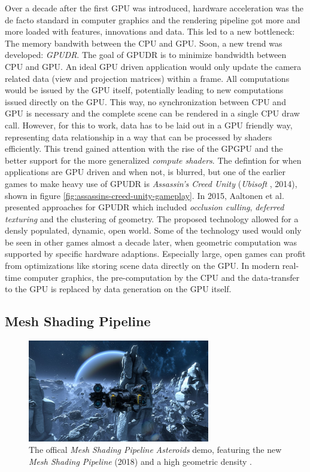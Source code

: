 Over a decade after the first \ac{GPU} was introduced, hardware acceleration was the de facto standard in 
computer graphics and the rendering pipeline got more and more loaded with features, innovations and data. 
This led to a new bottleneck: The memory bandwith between the \ac{CPU} and \ac{GPU}. Soon, a new trend was 
developed: \emph{\ac{GPUDR}}. The goal of \ac{GPUDR} is to minimize bandwidth between \ac{CPU} and \ac{GPU}. 
An ideal \ac{GPU} driven application would only update the camera related data (view and projection matrices) 
within a frame. All computations would be issued by the \ac{GPU} itself, potentially leading to new computations 
issued directly on the \ac{GPU}. This way, no synchronization between \ac{CPU} and \ac{GPU} is necessary and the 
complete scene can be rendered in a single \ac{CPU} draw call. However, for this to work, data has to be laid out 
in a \ac{GPU} friendly way, representing data relationship in a way that can be processed by shaders efficiently.
This trend gained attention with the rise of the \ac{GPGPU} and the better support for the more generalized 
\emph{compute shaders}. The defintion for when applications are \ac{GPU} driven and when not, is blurred, but one 
of the earlier games to make heavy use of \ac{GPUDR} is \emph{Assassin's Creed Unity} 
(\emph{Ubisoft} \cite{Ubisoft2014}, 2014), shown in figure \ref{fig:assassins-creed-unity-gameplay}. 
In 2015, Aaltonen et al. \cite{Aaltonen2015} presented approaches for \ac{GPUDR} which included \emph{occlusion culling},
\emph{deferred texturing} and the clustering of geometry. The proposed technology allowed for a densly populated, 
dynamic, open world. Some of the technology used would only be seen in other games almost a decade later, when 
geometric computation was supported by specific hardware adaptions. Especially large, open games can profit from 
optimizations like storing scene data directly on the \ac{GPU}. In modern real-time computer graphics, the 
pre-computation by the \ac{CPU} and the data-transfer to the \ac{GPU} is replaced by data generation on the \ac{GPU} itself.

\subsection*{Mesh Shading Pipeline} \label{subsec-mesh-shading-pipeline}


\begin{figure}[h]
    \centering
    \includegraphics[width=300px]{images/graphics/mesh-shading-asteroids-demo.jpg}
    \caption{The offical \emph{Mesh Shading Pipeline} \emph{Asteroids} demo, featuring the new \emph{Mesh Shading Pipeline} (2018)
    and a high geometric density \cite{Kraemer2018}.}
    \label{fig:mesh-shading-asteroids-demo}
\end{figure}


